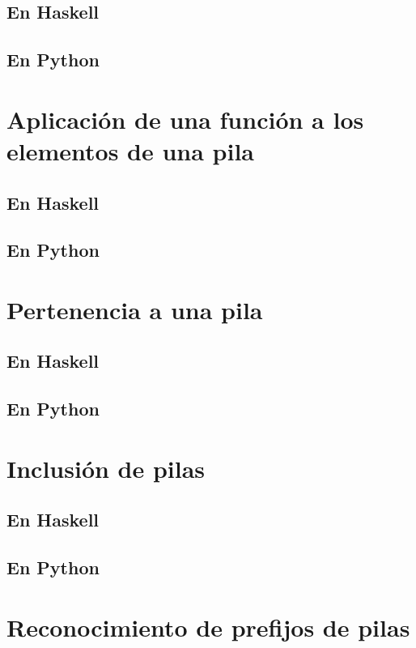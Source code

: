 \documentclass[a4paper,12pt,twoside]{book}
\begin{document}
\subsection{En Haskell}
\subsection{En Python}

\section{Aplicación de una función a los elementos de una pila}
\subsection{En Haskell}
\subsection{En Python}

\section{Pertenencia a una pila}
\subsection{En Haskell}
\subsection{En Python}

\section{Inclusión de pilas}
\subsection{En Haskell}
\subsection{En Python}

\section{Reconocimiento de prefijos de pilas}
\end{document}
